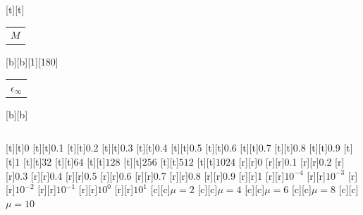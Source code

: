 %    
%
%
\begin{psfrags}%
\psfragscanon%
%
[t][t]{\color[rgb]{0,0,0}\setlength{\tabcolsep}{0pt}\begin{tabular}{c}$M$\end{tabular}}%
[b][b][1][180]{\color[rgb]{0,0,0}\setlength{\tabcolsep}{0pt}\begin{tabular}{c}$\epsilon_{\infty}$\end{tabular}}%
[b][b]{\color[rgb]{0,0,0}\setlength{\tabcolsep}{0pt}\begin{tabular}{c}\end{tabular}}%
%
[t][t]{0}%
[t][t]{0.1}%
[t][t]{0.2}%
[t][t]{0.3}%
[t][t]{0.4}%
[t][t]{0.5}%
[t][t]{0.6}%
[t][t]{0.7}%
[t][t]{0.8}%
[t][t]{0.9}%
[t][t]{1}%
[t][t]{${32}$}%
[t][t]{${64}$}%
[t][t]{${128}$}%
[t][t]{${256}$}%
[t][t]{${512}$}%
[t][t]{${1024}$}%
%
[r][r]{0}%
[r][r]{0.1}%
[r][r]{0.2}%
[r][r]{0.3}%
[r][r]{0.4}%
[r][r]{0.5}%
[r][r]{0.6}%
[r][r]{0.7}%
[r][r]{0.8}%
[r][r]{0.9}%
[r][r]{1}%
[r][r]{$10^{-4}$}%
[r][r]{$10^{-3}$}%
[r][r]{$10^{-2}$}%
[r][r]{$10^{-1}$}%
[r][r]{$10^{0}$}%
[r][r]{$10^{1}$}%
[c][c]{$\scriptstyle\mu=2$}%
[c][c]{$\scriptstyle\mu=4$}%
[c][c]{$\scriptstyle\mu=6$}%
[c][c]{$\scriptstyle\mu=8$}%
[c][c]{$\scriptstyle\mu=10$}%
%

\end{psfrags}

